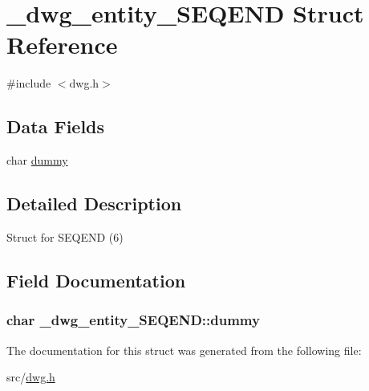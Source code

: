 \hypertarget{struct__dwg__entity__SEQEND}{\section{\-\_\-dwg\-\_\-entity\-\_\-\-S\-E\-Q\-E\-N\-D \-Struct \-Reference}
\label{struct__dwg__entity__SEQEND}
}


{\ttfamily \#include $<$dwg.\-h$>$}

\subsection*{\-Data \-Fields}
\begin{DoxyCompactItemize}
\item 
char \hyperlink{struct__dwg__entity__SEQEND_ae0fb21fefffb0da6cf5eb8dd797cf9b5}{dummy}
\end{DoxyCompactItemize}


\subsection{\-Detailed \-Description}
\-Struct for \-S\-E\-Q\-E\-N\-D (6) 

\subsection{\-Field \-Documentation}
\hypertarget{struct__dwg__entity__SEQEND_ae0fb21fefffb0da6cf5eb8dd797cf9b5}{
\subsubsection[{dummy}]{\setlength{\rightskip}{0pt plus 5cm}char {\bf \-\_\-dwg\-\_\-entity\-\_\-\-S\-E\-Q\-E\-N\-D\-::dummy}}}\label{struct__dwg__entity__SEQEND_ae0fb21fefffb0da6cf5eb8dd797cf9b5}


\-The documentation for this struct was generated from the following file\-:\begin{DoxyCompactItemize}
\item 
src/\hyperlink{dwg_8h}{dwg.\-h}\end{DoxyCompactItemize}
